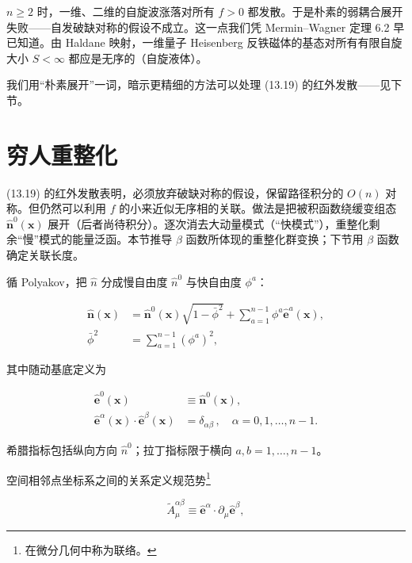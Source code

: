 $n \geq 2$ 时，一维、二维的自旋波涨落对所有 $f > 0$ 都发散。于是朴素的弱耦合展开失败——自发破缺对称的假设不成立。这一点我们凭 Mermin--Wagner 定理 6.2 早已知道。由 Haldane 映射，一维量子 Heisenberg 反铁磁体的基态对所有有限自旋大小 $S < \infty$ 都应是无序的（自旋液体）。

我们用“朴素展开”一词，暗示更精细的方法可以处理 (13.19) 的红外发散——见下节。

\section{穷人重整化}

(13.19) 的红外发散表明，必须放弃破缺对称的假设，保留路径积分的 $O(n)$ 对称。但仍然可以利用 $f$ 的小来近似无序相的关联。做法是把被积函数绕缓变组态 $\hat{\mathbf{n}}^{0}(\mathbf{x})$ 展开（后者尚待积分）。逐次消去大动量模式（“快模式”），重整化剩余“慢”模式的能量泛函。本节推导 $\beta$ 函数所体现的重整化群变换；下节用 $\beta$ 函数确定关联长度。

循 Polyakov，把 $\hat{n}$ 分成慢自由度 $\hat{n}^{0}$ 与快自由度 $\phi^{a}$：

\begin{align*}
\hat {\mathbf {n}} ( \mathbf {x} ) & = \hat {\mathbf {n}} ^ {0} ( \mathbf {x} ) \sqrt {1 - \bar {\phi} ^ {2}} + \sum_ {a = 1} ^ {n - 1} \phi^ {a} \hat {\mathbf {e}} ^ {a} ( \mathbf {x} ) ,\\
\bar {\phi} ^ {2} & = \sum_ {a = 1} ^ {n - 1} \left( \phi^ {a} \right) ^ {2} ,
\tag{13.20}
\end{align*}

其中随动基底定义为

\begin{align*}
\hat {\mathbf {e}} ^ {0} ( \mathbf {x} ) & \equiv \hat {\mathbf {n}} ^ {0} ( \mathbf {x} ) ,\\
\hat {\mathbf {e}} ^ {\alpha} ( \mathbf {x} ) \cdot \hat {\mathbf {e}} ^ {\beta} ( \mathbf {x} ) & = \delta_ {\alpha \beta} \, , \quad \alpha = 0, 1, \ldots , n - 1 .
\tag{13.21}
\end{align*}

希腊指标包括纵向方向 $\hat{n}^{0}$；拉丁指标限于横向 $a, b = 1, \ldots, n - 1$。

空间相邻点坐标系之间的关系定义规范势\footnote{在微分几何中称为联络。}

\begin{equation*}
\tilde {A} _ {\mu} ^ {\alpha \beta} \equiv \hat {\mathbf {e}} ^ {\alpha} \cdot \partial_ {\mu} \hat {\mathbf {e}} ^ {\beta} ,
\tag{13.22}
\end{equation*}

